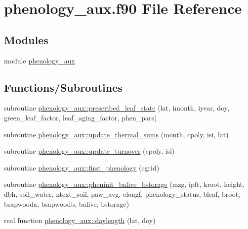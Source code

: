 \hypertarget{phenology__aux_8f90}{}\section{phenology\+\_\+aux.\+f90 File Reference}
\label{phenology__aux_8f90}
\subsection*{Modules}
\begin{DoxyCompactItemize}
\item 
module \hyperlink{namespacephenology__aux}{phenology\+\_\+aux}
\end{DoxyCompactItemize}
\subsection*{Functions/\+Subroutines}
\begin{DoxyCompactItemize}
\item 
subroutine \hyperlink{namespacephenology__aux_aac80b26fc41e788ad7669441222543ff}{phenology\+\_\+aux\+::prescribed\+\_\+leaf\+\_\+state} (lat, imonth, iyear, doy, green\+\_\+leaf\+\_\+factor, leaf\+\_\+aging\+\_\+factor, phen\+\_\+pars)
\item 
subroutine \hyperlink{namespacephenology__aux_a227cf46507f7976ea4dd53e724e157c0}{phenology\+\_\+aux\+::update\+\_\+thermal\+\_\+sums} (month, cpoly, isi, lat)
\item 
subroutine \hyperlink{namespacephenology__aux_a7a199ed988a720b2e56c3b5e1407995a}{phenology\+\_\+aux\+::update\+\_\+turnover} (cpoly, isi)
\item 
subroutine \hyperlink{namespacephenology__aux_ac9c11ddf83cd16439262bc9c7c72bf2e}{phenology\+\_\+aux\+::first\+\_\+phenology} (cgrid)
\item 
subroutine \hyperlink{namespacephenology__aux_ac99e8cfcfd964b2feceda6835f18a4e2}{phenology\+\_\+aux\+::pheninit\+\_\+balive\+\_\+bstorage} (mzg, ipft, kroot, height, dbh, soil\+\_\+water, ntext\+\_\+soil, paw\+\_\+avg, elongf, phenology\+\_\+status, bleaf, broot, bsapwooda, bsapwoodb, balive, bstorage)
\item 
real function \hyperlink{namespacephenology__aux_a6fd36340ae7c75f11750adbf09d700d9}{phenology\+\_\+aux\+::daylength} (lat, doy)
\end{DoxyCompactItemize}
